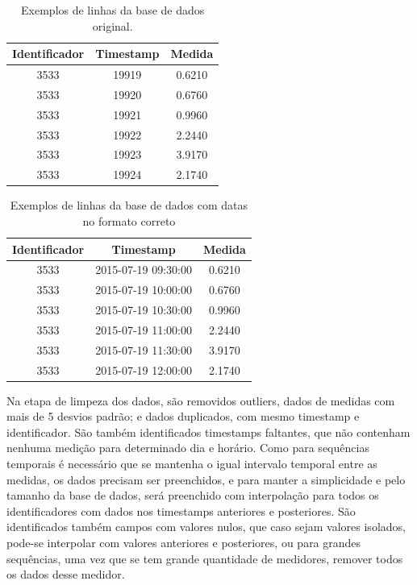 \documentclass[
	12pt,				%
	oneside,			%
	a4paper,			%
	english,			%
	brazil				%
	]{abntex2}
\begin{document}
\begin{table}
\centering
 \begin{tabular}{|c|c|c|} 
 \hline
 Identificador & Timestamp & Medida \\ [0.5ex] 
 \hline\hline
  3533    &      19919&    0.6210\\
 \hline
  3533     &     19920 &   0.6760\\
 \hline
  3533     &     19921  &  0.9960\\
 \hline
  3533     &     19922   & 2.2440\\
 \hline
  3533      &    19923   & 3.9170\\
 \hline
  3533       &   19924&    2.1740\\
 \hline
\end{tabular}
\caption{Exemplos de linhas da base de dados original.}
\label{table:RawData}
\end{table}


\begin{table}
\centering
 \begin{tabular}{|c|c|c|} 
 \hline
 Identificador & Timestamp & Medida \\ [0.5ex] 
 \hline\hline
  3533    &      2015-07-19  09:30:00&    0.6210\\
 \hline
  3533     &     2015-07-19 10:00:00&   0.6760\\
 \hline
  3533     &     2015-07-19  10:30:00&  0.9960\\
 \hline
  3533     &     2015-07-19 11:00:00    & 2.2440\\
 \hline
  3533      &    2015-07-19  11:30:00  & 3.9170\\
 \hline
  3533       &   2015-07-19 12:00:00&    2.1740\\
 \hline
\end{tabular}
\caption{Exemplos de linhas da base de dados com datas no formato correto}
\label{table:CleanData}
\end{table}
		
	Na etapa de limpeza dos dados, são removidos outliers, dados de medidas com mais de 5 desvios padrão; e dados duplicados, com mesmo timestamp e identificador. São também identificados timestamps faltantes, que não contenham nenhuma medição para determinado dia e horário. Como para sequências temporais é necessário que se mantenha o igual intervalo temporal entre as medidas, os dados precisam ser preenchidos, e para manter a simplicidade e pelo tamanho da base de dados, será preenchido com interpolação para todos os identificadores com dados nos timestamps anteriores e posteriores. São identificados também campos com valores nulos, que caso sejam valores isolados, pode-se interpolar com valores anteriores e posteriores, ou para grandes sequências, uma vez que se tem grande quantidade de medidores, remover todos os dados desse medidor. 
	
\end{document}
